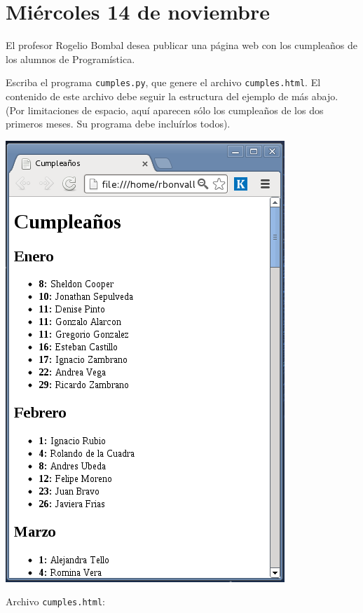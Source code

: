\documentclass[12pt,spanish]{article}
\begin{document}
  \thispagestyle{empty}
  \section*{Miércoles 14 de noviembre}

  El profesor Rogelio Bombal desea publicar una página web
  con los cumpleaños de los alumnos de Programística.

  Escriba el programa \texttt{cumples.py},
  que genere el archivo \texttt{cumples.html}.
  El contenido de este archivo debe seguir la estructura
  del ejemplo de más abajo.
  (Por limitaciones de espacio,
  aquí aparecen sólo los cumpleaños de los dos primeros meses.
  Su programa debe incluírlos todos).

  \begin{minipage}[T]{.40\textwidth}
    \includegraphics[width=\textwidth]{cumples.png}
  \end{minipage}
  \hfill
  \begin{minipage}[T]{.55\textwidth}
    Archivo \texttt{cumples.html}:
    
  \end{minipage}
\end{document}
